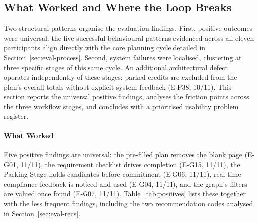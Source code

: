 \subsection{What Worked and Where the Loop Breaks}
\label{sec:eval-findings}

Two structural patterns organise the evaluation findings. First, positive outcomes were universal: the five successful behavioural patterns evidenced across all eleven participants align directly with the core planning cycle detailed in Section~\ref{sec:eval-process}. Second, system failures were localised, clustering at three specific stages of this same cycle. An additional architectural defect operates independently of these stages: parked credits are excluded from the plan's overall totals without explicit system feedback (E-P38, 10/11). This section reports the universal positive findings, analyses the friction points across the three workflow stages, and concludes with a prioritised usability problem register.

\paragraph{What Worked}
\label{sec:eval-positives}

Five positive findings are universal: the pre-filled plan removes the blank page (E-G01, 11/11), the requirement checklist drives completion (E-G15, 11/11), the Parking Stage holds candidates before commitment (E-G06, 11/11), real-time compliance feedback is noticed and used (E-G04, 11/11), and the graph's filters are valued once found (E-G07, 11/11). Table~\ref{tab:positives} lists these together with the less frequent findings, including the two recommendation codes analysed in Section~\ref{sec:eval-recs}.

